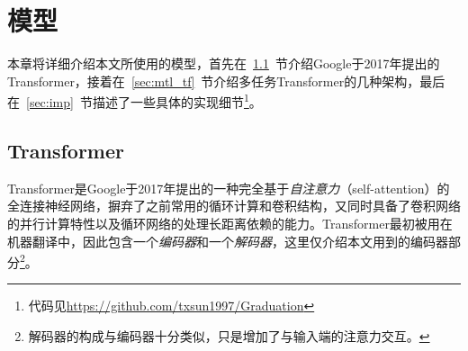 \chapter{模型}
\label{cha:model}
本章将详细介绍本文所使用的模型，首先在~\ref{sec:tf}~节介绍Google于2017年提出的Transformer，接着在~\ref{sec:mtl_tf}~节介绍多任务Transformer的几种架构，最后在~\ref{sec:imp}~节描述了一些具体的实现细节\footnote{代码见\url{https://github.com/txsun1997/Graduation}}。

\section{Transformer}
\label{sec:tf}
Transformer是Google于2017年提出的一种完全基于\emph{自注意力}（self-attention）的全连接神经网络\cite{DBLP:conf/nips/VaswaniSPUJGKP17}，摒弃了之前常用的循环计算和卷积结构，又同时具备了卷积网络的并行计算特性以及循环网络的处理长距离依赖的能力。Transformer最初被用在机器翻译中，因此包含一个\emph{编码器}和一个\emph{解码器}，这里仅介绍本文用到的编码器部分\footnote{解码器的构成与编码器十分类似，只是增加了与输入端的注意力交互。}。

